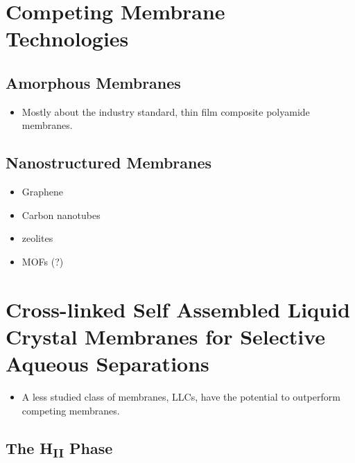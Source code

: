   \section{Competing Membrane Technologies}

  \subsection{Amorphous Membranes}
  
  \begin{itemize}  
  
  \item Mostly about the industry standard, thin film composite polyamide membranes.
  
  \end{itemize}
  
  \subsection{Nanostructured Membranes}
  
  \begin{itemize}  
  
  \item Graphene
  \item Carbon nanotubes
  \item zeolites
  \item MOFs (?) %
  
  \end{itemize}
  
  \section{Cross-linked Self Assembled Liquid Crystal Membranes for Selective Aqueous Separations}
  
  \begin{itemize}    
  
  \item A less studied class of membranes, LLCs, have the potential to outperform competing membranes.
  
  \end{itemize}
  
  \subsection{The H\textsubscript{II} Phase}
  
